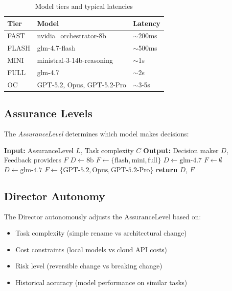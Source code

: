 \documentclass[11pt,a4paper]{article}
\begin{document}
\begin{table}[h]
\centering
\begin{tabular}{lll}
\toprule
\textbf{Tier} & \textbf{Model} & \textbf{Latency} \\
\midrule
FAST & nvidia\_orchestrator-8b & $\sim$200ms \\
FLASH & glm-4.7-flash & $\sim$500ms \\
MINI & ministral-3-14b-reasoning & $\sim$1s \\
FULL & glm-4.7 & $\sim$2s \\
OC & GPT-5.2, Opus, GPT-5.2-Pro & $\sim$3-5s \\
\bottomrule
\end{tabular}
\caption{Model tiers and typical latencies}
\label{tab:tiers}
\end{table}

\subsection{Assurance Levels}

The \emph{AssuranceLevel} determines which model makes decisions:

\begin{algorithm}
\caption{Cascade Decision Selection}
\begin{algorithmic}[1]
\State \textbf{Input:} AssuranceLevel $L$, Task complexity $C$
\State \textbf{Output:} Decision maker $D$, Feedback providers $F$
    \State $D \gets \text{8b}$
    \State $F \gets \{\text{flash}, \text{mini}, \text{full}\}$
    \State $D \gets \text{glm-4.7}$
    \State $F \gets \emptyset$
    \State $D \gets \text{glm-4.7}$
    \State $F \gets \{\text{GPT-5.2}, \text{Opus}, \text{GPT-5.2-Pro}\}$
\EndIf
\State \textbf{return} $D$, $F$
\end{algorithmic}
\end{algorithm}

\subsection{Director Autonomy}

The Director autonomously adjusts the AssuranceLevel based on:
\begin{itemize}
    \item Task complexity (simple rename vs architectural change)
    \item Cost constraints (local models vs cloud API costs)
    \item Risk level (reversible change vs breaking change)
    \item Historical accuracy (model performance on similar tasks)
\end{itemize}
\end{document}
